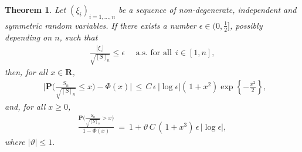 \documentclass{gSTA2e}
\theoremstyle{plain}
\newtheorem{theorem}{Theorem}[section]
\theoremstyle{definition}
\theoremstyle{remark}
\begin{document}
\begin{theorem}\label{th3.3} Let $(\xi_i)_{i=1,...,n}$ be a sequence of non-degenerate, independent and symmetric random variables. If there exists a number  $\epsilon \in  (0, \frac12]$, possibly depending on $n$, such that
\begin{eqnarray}\label{fhsnnl}
  \frac{|\xi_i| }{ \sqrt{[S]_n}  }  \leq \epsilon \ \ \ \ \ \ \textrm{a.s.\ for all} \ \  i \in [1, n],
\end{eqnarray}
then, for all $x \in \mathbf{R}$,
\begin{eqnarray} \label{fgs}
  \ \ \  \Big| \mathbf{P}\Big( \frac{S_n}{\sqrt{[S]_n}} \leq x \Big)-  \Phi\left( x\right) \Big|  \,\leq \, C\, \epsilon \, |\log \epsilon|  \left(\frac{}{}\! 1+ x^2 \right) \exp\left\{-\frac{ x ^2}{2}\right\} ,
\end{eqnarray}
and, for all $x  \geq 0$,
\begin{eqnarray}\label{fgs01}
  \frac{\mathbf{P}\Big( \frac{S_n}{\sqrt{[S]_n}} > x  \Big)}{1-  \Phi(x) } \ = \  1+   \vartheta \, C \,\left(\frac{}{}\! 1+ x^3 \right)  \, \epsilon \, |\log \epsilon| ,
\end{eqnarray}
where $|\vartheta| \leq 1.$
\end{theorem}
\end{document}
